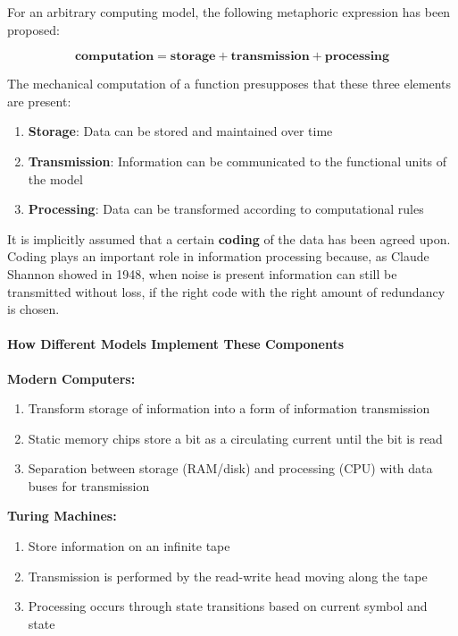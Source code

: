 For an arbitrary computing model, the following metaphoric expression has been proposed:

\begin{equation}
\label{eq:computation-formula}
\textbf{computation} = \textbf{storage} + \textbf{transmission} + \textbf{processing}
\end{equation}

The mechanical computation of a function presupposes that these three elements are present:

\begin{enumerate}
\item \textbf{Storage}: Data can be stored and maintained over time
\item \textbf{Transmission}: Information can be communicated to the functional units of the model  
\item \textbf{Processing}: Data can be transformed according to computational rules
\end{enumerate}

It is implicitly assumed that a certain \textbf{coding} of the data has been agreed upon. Coding plays an important role in information processing because, as Claude Shannon showed in 1948, when noise is present information can still be transmitted without loss, if the right code with the right amount of redundancy is chosen.

\paragraph{How Different Models Implement These Components}
\label{para:model-implementations}

\textbf{Modern Computers:}

\begin{enumerate}
\item Transform storage of information into a form of information transmission
\item Static memory chips store a bit as a circulating current until the bit is read
\item Separation between storage (RAM/disk) and processing (CPU) with data buses for transmission
\end{enumerate}

\textbf{Turing Machines:}

\begin{enumerate}
\item Store information on an infinite tape
\item Transmission is performed by the read-write head moving along the tape
\item Processing occurs through state transitions based on current symbol and state
\end{enumerate}

